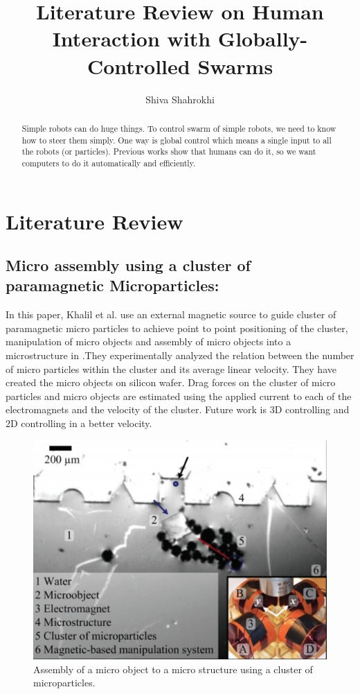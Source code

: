 \documentclass[letterpaper, 10 pt, conference]{ieeeconf}
\begin{document}
\author{Shiva Shahrokhi}
\title{Literature Review on Human Interaction with Globally-Controlled Swarms}
\maketitle

\begin{abstract}

Simple robots can do huge things. To control swarm of simple robots, we need to know how to steer them simply. One way is global control which means a single input to all the robots (or particles). Previous works show that humans can do it, so we want computers to do it automatically and efficiently.
 
\end{abstract}

\section{Literature Review}
\subsection{Micro assembly using a cluster of paramagnetic Microparticles:}

In this paper, Khalil et al. use an external magnetic source to guide cluster of paramagnetic micro particles to achieve point to point positioning of the cluster, manipulation of micro objects and assembly of micro objects into a microstructure in \cite{Khalil2013}.They experimentally analyzed the relation between the number of micro particles within the cluster and its average linear velocity. They have created the micro objects on silicon wafer. Drag forces on the cluster of micro particles and micro objects are estimated using the applied current to each of the electromagnets and the velocity of the cluster. Future work is 3D controlling and 2D controlling in a better velocity.
\begin{figure}[h]
\begin{center}
\includegraphics[width=\columnwidth]{khalil.png}
\caption{Assembly of a micro object to a micro structure using a cluster of microparticles\cite{Khalil2013}.
\label{fig:khalil}}
\end{center}
\end{figure}
\end{document}
